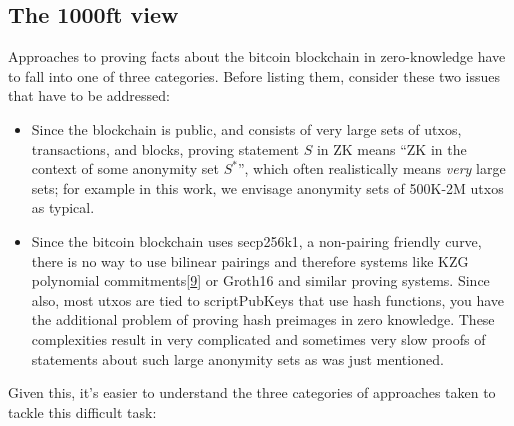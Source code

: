 \documentclass[10pt,a4paper]{article}
\begin{document}
\subsection{The 1000ft view}

Approaches to proving facts about the bitcoin blockchain in zero-knowledge have to fall into one of three categories. Before listing them, consider these two issues that have to be addressed:

\begin{itemize}
\item Since the blockchain is public, and consists of very large sets of utxos, transactions, and blocks, proving statement $S$ in ZK means ``ZK in the context of some anonymity set $S^*$'', which often realistically means \emph{very} large sets; for example in this work, we envisage anonymity sets of 500K-2M utxos as typical.
\item Since the bitcoin blockchain uses secp256k1, a non-pairing friendly curve, there is no way to use bilinear pairings and therefore systems like KZG polynomial commitments{[}\protect\hyperlink{anchor-9}{9}{]} or Groth16 and similar proving systems. Since also, most utxos are tied to scriptPubKeys that use hash functions, you have the additional problem of proving hash preimages in zero knowledge. These complexities result in very complicated and sometimes very slow proofs of statements about such large anonymity sets as was just mentioned.
\end{itemize}

Given this, it's easier to understand the three categories of approaches taken to tackle this difficult task:
\end{document}
